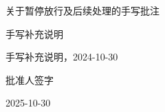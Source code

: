 \documentclass[UTF8,10pt,a4paper,fontset=fandol]{ctexart}
\newcommand{\fieldvalue}[1]{#1}
\newcommand{\handwritten}[1]{#1}
\begin{document}
\fieldvalue{\handwritten{关于暂停放行及后续处理的手写批注}}

\fieldvalue{\handwritten{手写补充说明}}

\fieldvalue{\handwritten{手写补充说明，2024-10-30}}

\fieldvalue{\handwritten{批准人签字}}

\fieldvalue{\handwritten{2025-10-30}}

\newpage
\end{document}
